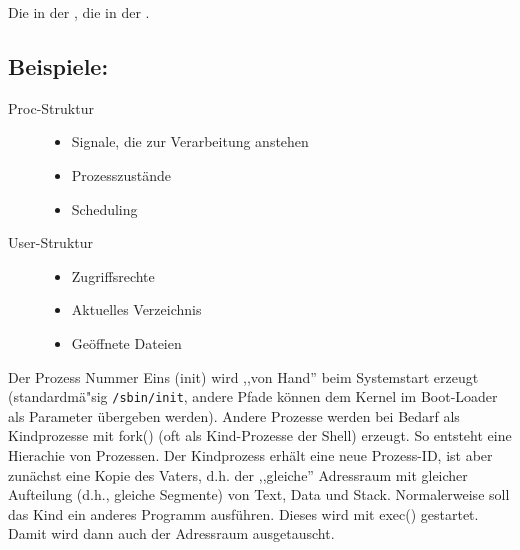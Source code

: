 \begin{answer}
  Die in der ,
  die in der .
  \subsection*{Beispiele:}
  \begin{description}
    \item[Proc-Struktur]\hfill
    \begin{itemize}
      \item Signale, die zur Verarbeitung anstehen
      \item Prozesszustände
      \item Scheduling
    \end{itemize} 
    \item[User-Struktur]\hfill
    \begin{itemize}
      \item Zugriffsrechte
      \item Aktuelles Verzeichnis
      \item Geöffnete Dateien
    \end{itemize} 
  \end{description}
\end{answer}

\begin{answer}
  Der Prozess Nummer Eins (init) wird ,,von Hand'' beim Systemstart erzeugt (standardmä"sig \texttt{/sbin/init}, andere Pfade können dem Kernel im Boot-Loader als Parameter übergeben werden).
  Andere Prozesse werden bei Bedarf als Kindprozesse mit fork() (oft als Kind-Prozesse
  der Shell) erzeugt. So entsteht eine Hierachie von Prozessen. Der Kindprozess erhält eine
  neue Prozess-ID, ist aber zunächst eine Kopie des Vaters, d.h. der ,,gleiche'' Adressraum
  mit gleicher Aufteilung (d.h., gleiche Segmente) von Text, Data und Stack. Normalerweise soll das Kind ein anderes
  Programm ausführen. Dieses wird mit exec() gestartet. Damit wird dann auch der
  Adressraum ausgetauscht.
\end{answer}

